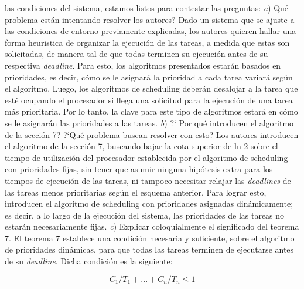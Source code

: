 las condiciones del sistema, estamos listos para contestar las preguntas:
\newline
\newline
\textit{a}) \textquestiondown Qu\'e problema est\'an intentando resolver los autores?
\newline
\newline
Dado un sistema que se ajuste a las condiciones de entorno previamente explicadas, los autores quieren hallar una forma heuristica de organizar la ejecuci\'on de las
tareas, a medida que estas son solicitadas, de manera tal de que todas terminen su ejecuci\'on antes de su respectiva \textit{deadline}. Para esto, los 
algoritmos presentados estar\'an basados en prioridades, es decir, c\'omo se le asignar\'a la prioridad a cada tarea variar\'a seg\'un el algoritmo. Luego, los algoritmos
de scheduling deber\'an desalojar a la tarea que est\'e ocupando el procesador si llega una solicitud para la ejecuci\'on de una
tarea m\'as prioritaria. Por lo tanto, la clave para este tipo de algoritmos estar\'a en c\'omo se le asignar\'an las prioridades a las tareas.
\newline
\newline
\textit{b}) ?` Por qu\'e introducen el algoritmo de la secci\'on 7? ?`Qu\'e problema buscan resolver con esto?
\newline
\newline
Los autores introducen el algoritmo de la secci\'on 7, buscando bajar la cota superior de ln 2 sobre el tiempo de utilizaci\'on del procesador establecida 
por el algoritmo de scheduling con prioridades fijas, sin tener que asumir ninguna hip\'otesis extra para los tiempos de ejecuci\'on de las tareas, ni tampoco 
necesitar relajar las \textit{deadlines} de las tareas menos prioritarias seg\'un el esquema anterior. Para lograr esto, introducen el algoritmo de 
scheduling con prioridades asignadas din\'amicamente; es decir, a lo largo de la ejecuci\'on del sistema, las prioridades de las tareas no estar\'an
necesariamente fijas.
\newline
\newline
\textit{c}) Explicar coloquialmente el significado del teorema 7.
\newline
\newline
El teorema 7 establece una condici\'on necesaria y suficiente, sobre el algoritmo de prioridades din\'amicas, para que todas las tareas terminen de ejecutarse
antes de su \textit{deadline}. Dicha condici\'on es la siguiente:

\begin{equation*}
 C_{1}/T_{1} + ... + C_{n}/T_{n} \leq 1
\end{equation*}

